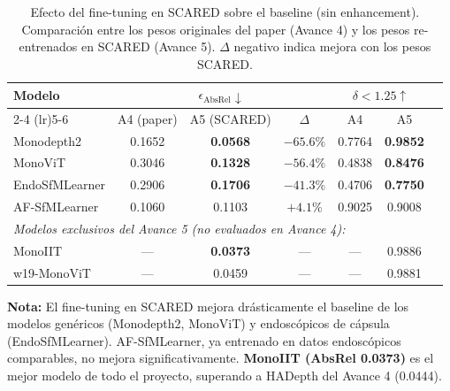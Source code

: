 \begin{table}[t]
\centering
\caption{Efecto del fine-tuning en SCARED sobre el baseline (sin enhancement). Comparación entre los pesos originales del paper (Avance 4) y los pesos re-entrenados en SCARED (Avance 5). $\Delta$ negativo indica mejora con los pesos SCARED.}
\label{tab:a4vsa5}
\setlength{\tabcolsep}{6pt}
\renewcommand{\arraystretch}{1.15}
\small
\begin{tabular}{lcccccc}
\toprule
\multirow{2}{*}{\textbf{Modelo}} & \multicolumn{3}{c}{$\epsilon_{\text{AbsRel}}\!\downarrow$} & \multicolumn{2}{c}{$\delta < 1.25\!\uparrow$} \\
\cmidrule(lr){2-4} \cmidrule(lr){5-6}
 & A4 (paper) & A5 (SCARED) & $\Delta$ & A4 & A5 \\
\midrule
Monodepth2     & 0.1652 & \textbf{0.0568} & $-65.6\%$ & 0.7764 & \textbf{0.9852} \\
MonoViT        & 0.3046 & \textbf{0.1328} & $-56.4\%$ & 0.4838 & \textbf{0.8476} \\
EndoSfMLearner & 0.2906 & \textbf{0.1706} & $-41.3\%$ & 0.4706 & \textbf{0.7750} \\
AF-SfMLearner  & 0.1060 & 0.1103 & $+4.1\%$ & 0.9025 & 0.9008 \\
\midrule
\multicolumn{6}{l}{\emph{Modelos exclusivos del Avance 5 (no evaluados en Avance 4):}} \\
MonoIIT        & --- & \textbf{0.0373} & --- & --- & 0.9886 \\
w19-MonoViT    & --- & 0.0459 & --- & --- & 0.9881 \\
\bottomrule
\end{tabular}

\vspace{2pt}
\footnotesize
\textbf{Nota:} El fine-tuning en SCARED mejora drásticamente el baseline de los modelos genéricos (Monodepth2, MonoViT) y endoscópicos de cápsula (EndoSfMLearner). AF-SfMLearner, ya entrenado en datos endoscópicos comparables, no mejora significativamente. \textbf{MonoIIT (AbsRel 0.0373)} es el mejor modelo de todo el proyecto, superando a HADepth del Avance 4 (0.0444).
\end{table}
